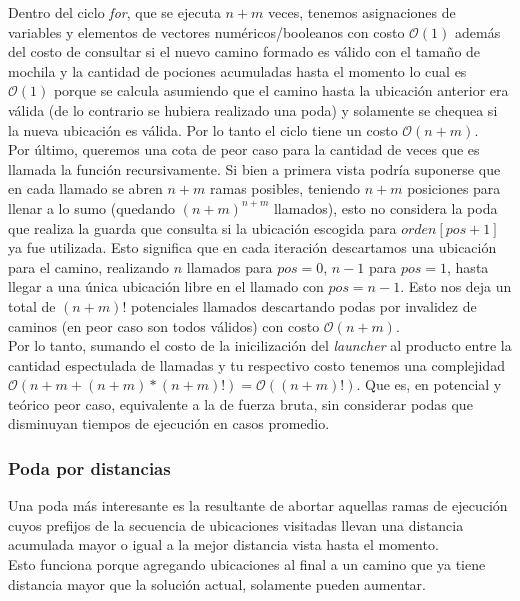     Dentro del ciclo \emph{for}, que se ejecuta $n+m$ veces, tenemos asignaciones de variables y elementos de vectores numéricos/booleanos con costo $\mathcal{O}(1)$ además del costo de consultar si el nuevo camino formado es válido con el tamaño de mochila y la cantidad de pociones acumuladas hasta el momento lo cual es $\mathcal{O}(1)$ porque se calcula asumiendo que el camino hasta la ubicación anterior era válida (de lo contrario se hubiera realizado una poda) y solamente se chequea si la nueva ubicación es válida. Por lo tanto el ciclo tiene un costo $\mathcal{O}(n+m)$.
    \\

    Por último, queremos una cota de peor caso para la cantidad de veces que es llamada la función recursivamente. Si bien a primera vista podría suponerse que en cada llamado se abren $n+m$ ramas posibles, teniendo $n+m$ posiciones para llenar a lo sumo (quedando $(n+m)^{n+m}$ llamados), esto no considera la poda que realiza la guarda que consulta si la ubicación escogida para $orden[pos+1]$ ya fue utilizada. Esto significa que en cada iteración descartamos una ubicación para el camino, realizando $n$ llamados para $pos=0$, $n-1$ para $pos=1$, hasta llegar a una única ubicación libre en el llamado con $pos=n-1$. Esto nos deja un total de $(n+m)!$ potenciales llamados descartando podas por invalidez de caminos (en peor caso son todos válidos) con costo $\mathcal{O}(n+m)$.
    \\

    Por lo tanto, sumando el costo de la inicilización del \emph{launcher} al producto entre la cantidad espectulada de llamadas y tu respectivo costo tenemos una complejidad $\mathcal{O}(n+m + (n+m)*(n+m)!) = \mathcal{O}((n+m)!)$. Que es, en potencial y teórico peor caso, equivalente a la de fuerza bruta, sin considerar podas que disminuyan tiempos de ejecución en casos promedio.

    \subsubsection{Poda por distancias}
    Una poda más interesante es la resultante de abortar aquellas ramas de ejecución cuyos prefijos de la secuencia de ubicaciones visitadas llevan una distancia acumulada mayor o igual a la mejor distancia vista hasta el momento.
    \\

    Esto funciona porque agregando ubicaciones al final a un camino que ya tiene distancia mayor que la solución actual, solamente pueden aumentar.
    \\

